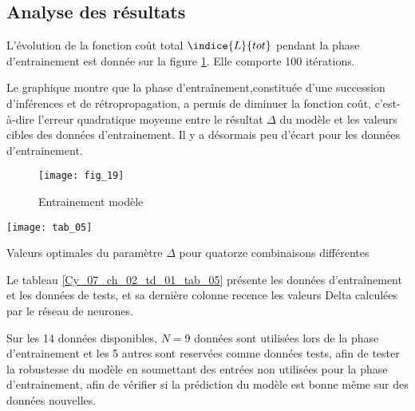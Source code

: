 \subsection*{Analyse des résultats}
L'évolution de la fonction coût total $\indice{L}{tot}$ pendant la phase d'entrainement est donnée sur la figure \ref{Cy_07_ch_02_td_01_fig_19}. Elle comporte 100 itérations. 


Le graphique montre que la phase d'entraînement,constituée d'une succession d'inférences et de rétropropagation, a permis de diminuer la fonction coût, c'est-à-dire l'erreur quadratique moyenne entre le résultat $\Delta$ du modèle et les valeurs cibles des données d'entrainement. Il y a désormais peu d'écart pour les données d'entrainement.

\begin{figure}[!h]
\centering
\texttt{[image: fig\_19]}
\caption{Entrainement modèle\label{Cy_07_ch_02_td_01_fig_19}}
\end{figure}


\begin{table}[!h]
\centering
\texttt{[image: tab\_05]}
\caption{Valeurs optimales du paramètre $\Delta$ pour quatorze combinaisons différentes \label{Cy_07_ch_02_td_01_tab_05}}
\end{table}


Le tableau \ref{Cy_07_ch_02_td_01_tab_05} présente les données d'entraînement et les données de tests, et sa dernière colonne recence les valeurs Delta calculées par le réseau de neurones.

Sur les 14 données disponibles, $N=9$ données sont utilisées lors de la phase d'entrainement et les 5 autres sont reservées comme données tests, afin de tester la robustesse du modèle en soumettant des entrées non utilisées pour la phase d'entrainement, afin de vérifier si la prédiction du modèle est bonne même sur des données nouvelles. 

\ifprof
\begin{corrige}
\end{corrige}
\else
\fi

\ifprof
\begin{corrige}
\end{corrige}
\else
\fi

\ifprof
\begin{corrige}
\end{corrige}
\else
\fi

